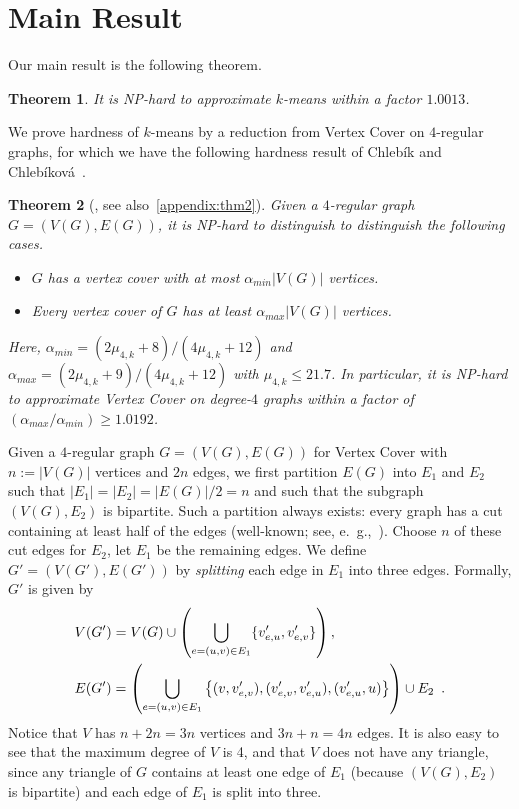 \documentclass{scrartcl}
\newtheorem{theorem}{Theorem}
\begin{document}
\section{Main Result}
Our main result is the following theorem.
\begin{theorem}
It is NP-hard to approximate $k$-means within a factor $1.0013$. 
\end{theorem}

We prove hardness of $k$-means by a reduction from Vertex Cover on $4$-regular graphs, 
for which we have the following hardness result of Chleb\'{i}k and Chleb\'{i}kov\'{a}~\cite{CC06}.
\begin{theorem}[\cite{CC06}, see also~\ref{appendix:thm2}] 
Given a $4$-regular graph $G = (V(G), E(G))$, it is NP-hard to distinguish to distinguish the following cases.
\begin{itemize}
\item $G$ has a vertex cover with at most $\alpha_{min} |V(G)|$ vertices. 
\item Every vertex cover of $G$ has at least $\alpha_{max} |V(G)|$ vertices. 
\end{itemize}
Here, $\alpha_{min} = (2\mu_{4,k}+8)/(4 \mu_{4,k}+12)$ and $\alpha_{max} = (2\mu_{4,k}+9)/(4 \mu_{4,k}+12)$ with $\mu_{4,k} \le 21.7$. In particular, it is NP-hard to approximate Vertex Cover on degree-$4$ graphs within a factor of $(\alpha_{max}/\alpha_{min}) \geq 1.0192$. 
\end{theorem}

Given a $4$-regular graph $G = (V(G), E(G))$ for Vertex Cover with $n := |V(G)|$ vertices and $2n$ edges, 
we first partition $E(G)$ into $E_1$ and $E_2$ such that $|E_1| = |E_2| = |E(G)|/2 = n$ and such that the subgraph $(V(G), E_2)$ is bipartite. 
Such a partition always exists: every graph has a cut containing at least half of the edges (well-known; see, e.~g.,~\cite{MU05}). Choose $n$ of these cut edges for $E_2$, let $E_1$ be the remaining edges.
We define $G' = (V(G'), E(G'))$ by {\em splitting} each edge in $E_1$ into three edges.
Formally, $G'$ is given by  
\begin{align*}
& V(G') = V(G) \cup \left(\bigcup_{e = (u, v) \in E_1} \{ v'_{e, u}, v'_{e, v} \}\right), \\
& E(G') = \left(\bigcup_{e = (u, v) \in E_1} \left\{ (v, v'_{e, v}), (v'_{e, v}, v'_{e, u}), (v'_{e, u}, u) \right\}\right) \cup E_2 \enskip.
\end{align*}
Notice that $V$ has $n + 2n = 3n$ vertices and $3n + n = 4n$ edges. 
It is also easy to see that the maximum degree of $V$ is 4, and that $V$ does not have any triangle, since any triangle of $G$ contains at least one edge of $E_1$ (because $(V(G), E_2)$ is bipartite) and each edge of $E_1$ is split into three. 
\end{document}
